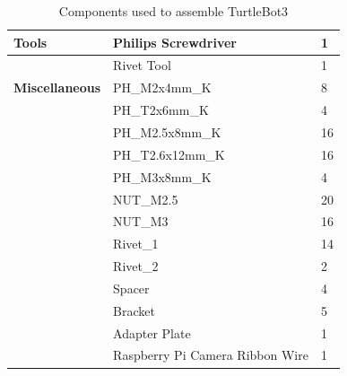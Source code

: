 \documentclass[12pt]{report}
\begin{document}
\begin{table}[H]
\begin{tabular}{|l|l|l|}
\textbf{Tools}         & Philips Screwdriver           & 1                         \\ \hline
              & Rivet Tool                    & 1                         \\ \hline
\textbf{Miscellaneous} & PH\_M2x4mm\_K                   & 8                         \\ \hline
              & PH\_T2x6mm\_K                   & 4                         \\ \hline
              & PH\_M2.5x8mm\_K                 & 16                        \\ \hline
              & PH\_T2.6x12mm\_K                & 16                        \\ \hline
              & PH\_M3x8mm\_K                   & 4                         \\ \hline
              & NUT\_M2.5                       & 20                        \\ \hline
              & NUT\_M3                         & 16                        \\ \hline
              & Rivet\_1                        & 14                        \\ \hline
              & Rivet\_2                        & 2                         \\ \hline
              & Spacer                          & 4                         \\ \hline
              & Bracket                         & 5                         \\ \hline
              & Adapter Plate                   & 1                         \\ \hline
              & Raspberry Pi Camera Ribbon Wire & 1                         \\
\bottomrule
\end{tabular}
\label{tab:Table 4.1}
\caption{Components used to assemble TurtleBot3}
\end{table}
\end{document}
